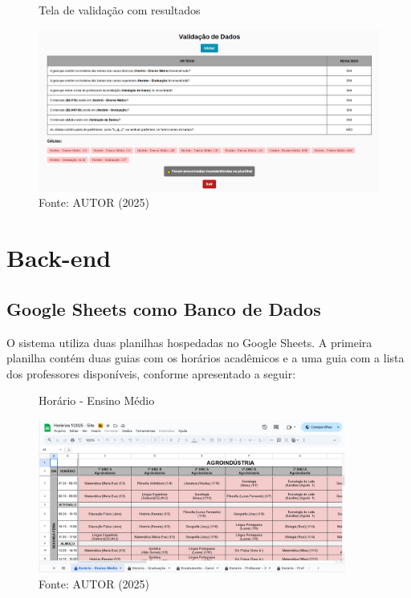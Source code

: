 \begin{itemize}
    \begin{figure}[htb]
        \centering
        \caption{Tela de validação com resultados}
        \includegraphics[width=1\textwidth]{Figuras/front-22.png}
        \caption*{Fonte: AUTOR (2025)}
        \label{fig_front_22}
    \end{figure}
\end{itemize}

\section{Back-end}

\subsection{Google Sheets como Banco de Dados}

O sistema utiliza duas planilhas hospedadas no Google Sheets. A primeira planilha contém duas guias com os horários acadêmicos e a uma guia com a lista dos professores disponíveis, conforme apresentado a seguir:

\begin{figure}[H]
    \centering
    \caption{Horário - Ensino Médio}
    \includegraphics[width=0.9\textwidth]{Figuras/plan-1.png}
    \caption*{Fonte: AUTOR (2025)}
    \label{fig_plan_1}
\end{figure}

